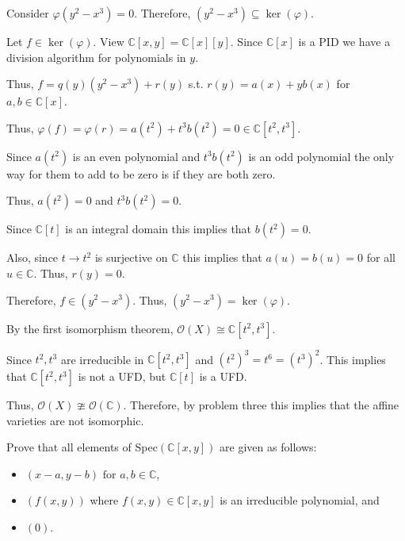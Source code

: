 \documentclass[12pt, letterpaper]{article}
\newcommand{\C}{\mathbb{C}}
\renewcommand{\t}[1]{\text{#1}}
\begin{document}
\begin{problemproof}
    Consider $\varphi(y^2-x^3)=0$. Therefore, $(y^2-x^3) \subseteq \ker(\varphi)$.

    Let $f \in \ker(\varphi)$. View $\C[x,y]=\C[x][y]$. Since $\C[x]$ is a PID we have a division algorithm for polynomials in $y$.

    Thus, $f=q(y)(y^2-x^3)+r(y)$ s.t. $r(y)=a(x)+yb(x)$ for $a,b \in \C[x]$.

    Thus, $\varphi(f)=\varphi(r)=a(t^2)+t^3b(t^2)=0 \in \C[t^2,t^3]$.

    Since $a(t^2)$ is an even polynomial and $t^3b(t^2)$ is an odd polynomial the only way for them to add to be zero is if they are both zero.

    Thus, $a(t^2)=0$ and $t^3b(t^2)=0$.

    Since $\C[t]$ is an integral domain this implies that $b(t^2)=0$.

    Also, since $t \to t^2$ is surjective on $\C$ this implies that $a(u)=b(u)=0$ for all $u \in \C$. Thus, $r(y)=0$.

    Therefore, $f \in (y^2-x^3)$. Thus, $(y^2-x^3)=\ker(\varphi)$.

    By the first isomorphism theorem, $\mathcal{O}(X) \cong \C[t^2,t^3]$.

    Since $t^2,t^3$ are irreducible in $\C[t^2,t^3]$ and $(t^2)^3=t^6=(t^3)^2$. This implies that $\C[t^2,t^3]$ is not a UFD, but $\C[t]$ is a UFD. 
    
    Thus, $\mathcal{O}(X) \ncong \mathcal{O}(\C)$. Therefore, by problem three this implies that the affine varieties are not isomorphic.
\end{problemproof}

\begin{problem}{}
    Prove that all elements of Spec$(\C[x,y])$ are given as follows:
    \begin{itemize}
        \item $(x-a,y-b) \t{ for } a,b \in \C$,
        \item $(f(x,y))$ where $f(x,y) \in \C[x,y]$ is an irreducible polynomial, and
        \item $(0)$.
    \end{itemize}
\end{problem}

\end{document}
